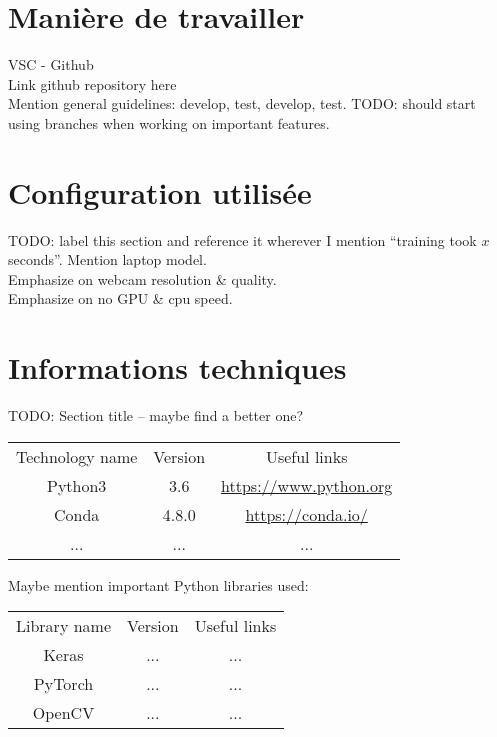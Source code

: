 \section{Manière de travailler}
VSC - Github\\
Link github repository here\\
Mention general guidelines: develop, test, develop, test.
TODO: should start using branches when working on important features.

\section{Configuration utilisée}
TODO: label this section and reference it wherever I mention ``training took $x$ seconds''.
Mention laptop model.\\
Emphasize on webcam resolution \& quality.\\
Emphasize on no GPU \& cpu speed.\\

\section{Informations techniques}
TODO: Section title – maybe find a better one?

\begin{center}
    \label{technologies-used}
    \begin{tabular}{ c c c }
        Technology name & Version & Useful links \\
        Python3 & 3.6 & \url{https://www.python.org} \\
        Conda & 4.8.0 & \url{https://conda.io/} \\
        ... & ... & ...
    \end{tabular}
\end{center}

Maybe mention important Python libraries used:\\

\begin{center}
    \label{technologies-used}
    \begin{tabular}{ c c c }
        Library name & Version & Useful links \\
        Keras & ... & ... \\
        PyTorch & ... & ... \\
        OpenCV & ... & ...
    \end{tabular}
\end{center}

